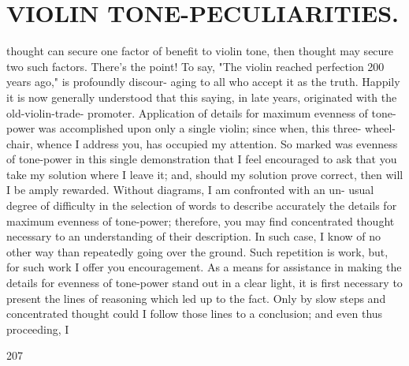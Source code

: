 \documentclass{article}
\begin{document}
\section*{VIOLIN TONE-PECULIARITIES.}
thought can secure one factor of benefit to violin tone, then thought may secure two such factors. There's the point! To say, "The violin reached perfection 200 years ago," is profoundly discour- aging to all who accept it as the truth. Happily it is now generally understood that this saying, in late years, originated with the old-violin-trade- promoter. Application of details for maximum evenness of tone-power was accomplished upon only a single violin; since when, this three- wheel-chair, whence I address you, has occupied my attention. So marked was evenness of tone-power in this single demonstration that I feel encouraged to ask that you take my solution where I leave it; and, should my solution prove correct, then will I be amply rewarded. Without diagrams, I am confronted with an un- usual degree of difficulty in the selection of words to describe accurately the details for maximum evenness of tone-power; therefore, you may find concentrated thought necessary to an understanding of their description. In such case, I know of no other way than repeatedly going over the ground. Such repetition is work, but, for such work I offer you encouragement. As a means for assistance in making the details for evenness of tone-power stand out in a clear light, it is first necessary to present the lines of reasoning which led up to the fact. Only by slow steps and concentrated thought could I follow those lines to a conclusion; and even thus proceeding, I

207
\end{document}
